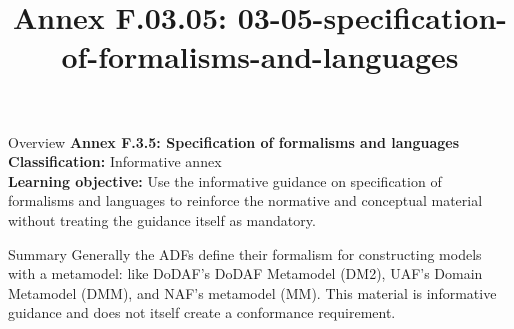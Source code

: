\documentclass[10pt,letterpaper]{article}
\title{Annex F.03.05: 03-05-specification-of-formalisms-and-languages}
\author{}
\date{}
\begin{document}
\maketitle
\begin{CornellOverviewBox}{Overview}
{\Large\bfseries\textcolor{CNavy}{Annex F.3.5: Specification of formalisms and languages}}\\[3pt]
{\small\textbf{Classification:} Informative annex}\\
{\small\textbf{Learning objective:} Use the informative guidance on specification of formalisms and languages to reinforce the normative and conceptual material without treating the guidance itself as mandatory.}
\end{CornellOverviewBox}
\vspace{3pt}

\begin{CornellNotesTable}
\end{CornellNotesTable}


\begin{CornellSummaryBox}{Summary}
Generally the ADFs define their formalism for constructing models with a metamodel: like DoDAF’s DoDAF Metamodel (DM2), UAF’s Domain Metamodel (DMM), and NAF’s metamodel (MM). This material is informative guidance and does not itself create a conformance requirement.
\end{CornellSummaryBox}
\end{document}
